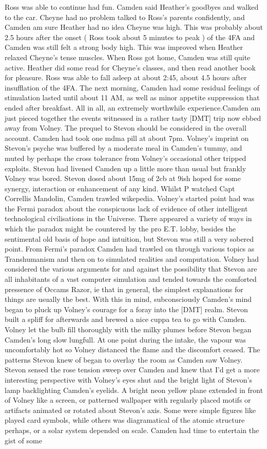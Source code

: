 \documentclass[12pt]{book}
\begin{document}
Ross was able to continue had fun. Camden said Heather's goodbyes and walked to the car. Cheyne had no problem talked to Ross's parents confidently, and Camden am sure Heather had no idea Cheyne was high. This was probably about 2.5 hours after the onset ( Ross took about 5 minutes to peak ) of the 4FA and Camden was still felt a strong body high. This was improved when Heather relaxed Cheyne's tense muscles. When Ross got home, Camden was still quite active. Heather did some read for Cheyne's classes, and then read another book for pleasure. Ross was able to fall asleep at about 2:45, about 4.5 hours after insufflation of the 4FA. The next morning, Camden had some residual feelings of stimulation lasted until about 11 AM, as well as minor appetite suppression that ended after breakfast. All in all, an extremely worthwhile experience.Camden am just pieced together the events witnessed in a rather tasty [DMT] trip now ebbed away from Volney. The prequel to Stevon should be considered in the overall account. Camden had took one mdma pill at about 7pm. Volney's imprint on Stevon's psyche was buffered by a moderate meal in Camden's tummy, and muted by perhaps the cross tolerance from Volney's occasional other tripped exploits. Stevon had livened Camden up a little more than usual but frankly Volney was bored. Stevon dosed about 15mg of 2cb at 9ish hoped for some synergy, interaction or enhancement of any kind. Whilst P watched Capt Correllis Mandolin, Camden trawled wikepedia. Volney's started point had was the Fermi paradox about the conspicuous lack of evidence of other intelligent technological civilisations in the Universe. There appeared a variety of ways in which the paradox might be countered by the pro E.T. lobby, besides the sentimental old basis of hope and intuition, but Stevon was still a very sobered point. From Fermi's paradox Camden had trawled on through various topics as Transhumanism and then on to simulated realities and computation. Volney had considered the various arguments for and against the possibility that Stevon are all inhabitants of a vast computer simulation and tended towards the comforted pressence of Occams Razor, ie that in general, the simplest explanations for things are usually the best. With this in mind, subconsciously Camden's mind began to pluck up Volney's courage for a foray into the [DMT] realm. Stevon built a spliff for afterwards and brewed a nice cuppa tea to go with Camden. Volney let the bulb fill thoroughly with the milky plumes before Stevon began Camden's long slow lungfull. At one point during the intake, the vapour was uncomfortably hot so Volney distanced the flame and the discomfort ceased. The patterns Stevon knew of began to overlay the room as Camden saw Volney. Stevon sensed the rose tension sweep over Camden and knew that I'd get a more interesting perspective with Volney's eyes shut and the bright light of Stevon's lamp backlighting Camden's eyelids. A bright neon yellow plane extended in front of Volney like a screen, or patterned wallpaper with regularly placed motifs or artifacts animated or rotated about Stevon's axis. Some were simple figures like played card symbols, while others was diagramatical of the atomic structure perhaps, or a solar system depended on scale. Camden had time to entertain the gist of some 
\end{document}
